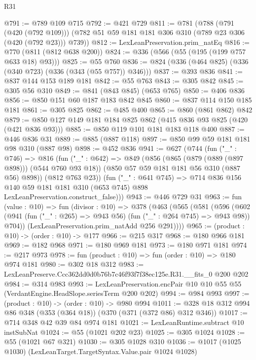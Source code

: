 \begin{lexlean}{R31}
\begin{coremodule}
@791 := @789 @109 @715
@792 := @421 @729
@811 := @781
    (@788
      (@791 (@420 (@792 @109)))
      (@782 @51 @59 @181 @181 @306 @310 (@789 @23 @306 (@420 (@792 @23))) @739))
@812 := LexLeanPreservation.prim_natEq
@816 := @770 (@811 (@812 @638 @200))
@824 := @336 (@566 (@55 (@195 (@199 @757 @633 @18) @93)))
@825 := @55 @760
@836 := @824 (@336 (@464 @825) (@336 (@340 @723) (@336 (@343 (@55 @757)) @346)))
@837 := @393 @836
@841 := @837 @144 @153 @189 @181
@842 := @55 @763
@843 := @305 @842
@845 := @305 @56 @310
@849 := @841 (@843 @845) (@653 @765)
@850 := @406 @836
@856 := @850 @151 @60 @187 @183 @842 @845
@860 := @837 @114 @150 @185 @181
@861 := @305 @825
@862 := @485 @400
@865 := @860 (@861 @862) @842
@879 := @850 @127 @149 @181 @184 @825 @862 (@415 @836 @93 @825 (@420 (@421 @836 @93)))
@885 := @850 @119 @101 @181 @183 @118 @400
@887 := @446 @836 @31
@889 := @885 (@887 @118)
@897 := @850 @99 @59 @181 @181 @98 @310 (@887 @98)
@898 := @452 @836
@941 := @627
    (@744
      (fun ("_" : @746) =>
      @816
        (fun ("_" : @642) =>
        @849
          (@856
            (@865 (@879 (@889 (@897 @898))) (@544 @760 @93 @18))
            (@850 @57 @59 @181 @181 @56 @310 (@887 @56) @898))
          (@812 @763 @23))
        (fun ("_" : @641 @745) =>
        @714
          @836
          @156
          @140
          @59
          @181
          @181
          @310
          (@653 @745)
          @898
          LexLeanPreservation.construct_false)))
@943 := @446 @729 @31
@963 := fun (value : @10) =>
  fun (divisor : @10) =>
  @378
    (@463
      (@565
        (@581
          (@596
            (@602 (@941 (fun ("_" : @265) => @943 @56) (fun ("_" : @264 @745) => @943 @98)) @704))
          (LexLeanPreservation.prim_natAdd @256 @291))))
@965 := (product : @10) -> (order : @10) -> @177
@966 := @215 @317
@968 := @180 @966 @181
@969 := @182 @968
@971 := @180 @969 @181
@973 := @180 @971 @181
@974 := @217 @973
@978 := fun (product : @10) => fun (order : @10) => @180 @974 @181
@980 := @302 @18 @312
@983 := LexLeanPreserve.Ccc362dd0d0b76b7c46f93f7f38ec125e.R31.__fits_0 @200 @202
@984 := @314 @983
@993 := LexLeanPreservation.encPair @10 @10 @55 @55 (VerdantEngine.HeadSlope.seriesTerm @200 @202)
@994 := @984 @993
@997 := (product : @10) -> (order : @10) -> @980 @994
@1011 := @328 @18 @312 @994 @86 @348 (@353 (@364 @18)) (@370 (@371 (@372 @86) @312 @346))
@1017 := @714 @348 @42 @39 @84 @974 @181
@1021 := LexLeanRuntime.subtract @10 instSubNat
@1024 := @55 (@1021 @202 @23)
@1025 := @305 @1024
@1028 := @55 (@1021 @67 @321)
@1030 := @305 @1028 @310
@1036 := @1017 (@1025 @1030) (LexLeanTarget.TargetSyntax.Value.pair @1024 @1028)

\end{coremodule}
\end{lexlean}
